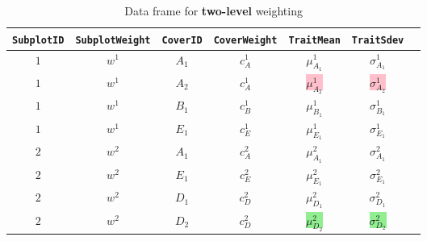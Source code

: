 \documentclass[12pt]{article}
\newcommand{\one}{1}
\newcommand{\two}{2}
\begin{document}
\begin{table}[htbp]
		\vspace{0.5cm} %
				
		\begin{subtable}[b]{0.9\textwidth}
			\centering
			\caption{Data frame for \textbf{two-level} weighting}
			\label{tab:l2_df}
			\begin{tabular}{c c c c c Sc}
				\toprule
				\texttt{SubplotID} & \texttt{SubplotWeight} & \texttt{CoverID} & \texttt{CoverWeight} & \texttt{TraitMean} & \texttt{TraitSdev}\\ 
				\midrule
				$\one$ & $w^{\one}$ & $A_1$ & $c_{A}^{\one}$ & $\mu_{A_1}^{\one}$ & $\sigma_{A_1}^{\one}$ \\
				$\one$ & $w^{\one}$ & $A_2$ & $c_{A}^{\one}$ & \colorbox{pink}{$\mu_{A_2}^{\one}$} & \colorbox{pink}{$\sigma_{A_2}^{\one}$} \\
				$\one$ & $w^{\one}$ & $B_1$ & $c_{B}^{\one}$ & $\mu_{B_1}^{\one}$ & $\sigma_{B_1}^{\one}$ \\ 
				$\one$ & $w^{\one}$ & $E_1$ & $c_{E}^{\one}$ & $\mu_{E_1}^{\one}$ & $\sigma_{E_1}^{\one}$ \\ 
				\hline 
				$\two$ & $w^{\two}$ & $A_1$ & $c_{A}^{\two}$ & $\mu_{A_1}^{\two}$ & $\sigma_{A_1}^{\two}$ \\
				$\two$ & $w^{\two}$ & $E_1$ & $c_{E}^{\two}$ & $\mu_{E_1}^{\two}$ & $\sigma_{E_1}^{\two}$ \\
				$\two$ & $w^{\two}$ & $D_1$ & $c_{D}^{\two}$ & $\mu_{D_1}^{\two}$ & $\sigma_{D_1}^{\two}$ \\
				$\two$ & $w^{\two}$ & $D_2$ & $c_{D}^{\two}$ & \colorbox{LightGreen}{$\mu_{D_2}^{\two}$} & \colorbox{LightGreen}{$\sigma_{D_2}^{\two}$} \\
				\bottomrule 
			\end{tabular}
		\end{subtable}	
	\end{table}
	
	\pagebreak 
	
\end{document}
